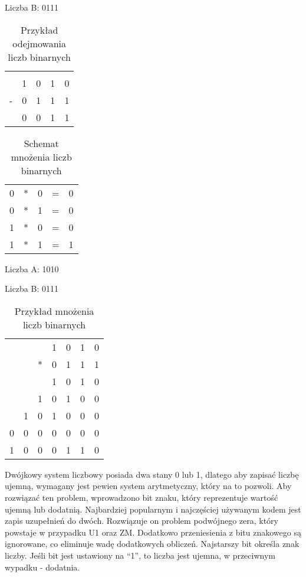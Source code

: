 \documentclass[12pt, a4paper, onside, polish]{article}				%
\begin{document}
Liczba B: 0111

\begin{table}[htb]
\caption{Przykład odejmowania liczb binarnych}
\centering
\begin{tabular}{lllll}
 &  &  &  &  \\
 & 1 & 0 & 1 & 0 \\
- & 0 & 1 & 1 & 1 \\ \hline
 & 0 & 0 & 1 & 1
\end{tabular}
\end{table}


\begin{table}[htb]
\caption{Schemat mnożenia liczb binarnych}
\centering
\begin{tabular}{lllll}
0 & * & 0 & = & 0 \\
0 & * & 1 & = & 0 \\
1 & * & 0 & = & 0 \\
1 & * & 1 & = & 1
\end{tabular}
\end{table}

Liczba A: 1010

Liczba B: 0111
\begin{table}[htb]
\caption{Przykład mnożenia liczb binarnych}
\centering
\begin{tabular}{lllllll}
 &  &  & 1 & 0 & 1 & 0 \\
 &  & * & 0 & 1 & 1 & 1 \\ \cline{3-7} 
 &  &  & 1 & 0 & 1 & 0 \\
 &  & 1 & 0 & 1 & 0 & 0 \\
 & 1 & 0 & 1 & 0 & 0 & 0 \\
0 & 0 & 0 & 0 & 0 & 0 & 0 \\ \hline
1 & 0 & 0 & 0 & 1 & 1 & 0 
\end{tabular}
\end{table}
\fi
Dwójkowy system liczbowy posiada dwa stany 0 lub 1, dlatego aby zapisać liczbę ujemną, wymagany jest pewien system arytmetyczny, który na to pozwoli. Aby rozwiązać ten problem, wprowadzono bit znaku, który reprezentuje wartość ujemną lub dodatnią. Najbardziej popularnym i najczęściej używanym kodem jest zapis uzupełnień do dwóch. Rozwiązuje on problem podwójnego zera, który powstaje w przypadku U1 oraz ZM. Dodatkowo przeniesienia z bitu znakowego są ignorowane, co eliminuje wadę dodatkowych obliczeń. Najstarszy bit określa znak liczby. Jeśli bit jest ustawiony na “1”, to liczba jest ujemna, w przeciwnym wypadku - dodatnia.   \newline
\end{document}
